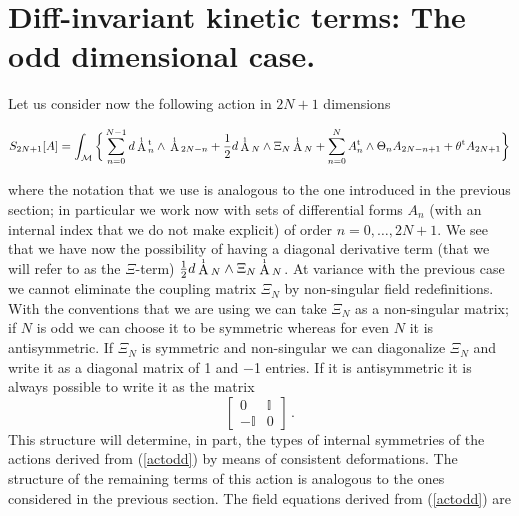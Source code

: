 \documentclass[prd,a4paper,twocolumn,amssymb,amsmath,nofootinbib,showpacs]{revtex4}
\newcommand{\au}{
\begin{picture}(11,3)(-2,-2)
\put(2,5){$\scriptscriptstyle{1}$} \put(0,-3){A}
\end{picture}}
\begin{document}
\section{\label{odd} Diff-invariant kinetic terms: The odd
dimensional case.}

Let us consider now the following action in $2N+1$ dimensions
\begin{widetext}
\begin{equation}
S_{2N+1}[A]=\int_{\mathcal{M}}\bigg\{\sum_{n=0}^{N-1}d\au_n^{\rm{t}}
\wedge\au_{2N-n}+\frac{1}{2}d\au_N\wedge\Xi_N\au_N+
\sum_{n=0}^{N}A_n^{\rm{t}}\wedge\Theta_nA_{2N-n+1}+
\theta^{\rm{t}}A_{2N+1}\bigg\}\label{actodd}
\end{equation}
\end{widetext}
where the notation that we use is analogous to the one introduced
in the previous section; in particular we work now with sets of
differential forms $A_n$ (with an internal index that we do not
make explicit) of order $n=0,\ldots,2N+1$. We see that we have now
the possibility of having a diagonal derivative term (that we will
refer to as the $\Xi$-term) $\frac{1}{2}d\au_N\wedge\Xi_N\au_N$.
At variance with the previous case we cannot eliminate the
coupling matrix $\Xi_N$ by non-singular field redefinitions. With
the conventions that we are using we can take $\Xi_N$ as a
non-singular matrix; if $N$ is odd we can choose it to be
symmetric whereas for even $N$ it is antisymmetric. If $\Xi_N$ is
symmetric and non-singular we can diagonalize $\Xi_N$  and write
it as a diagonal matrix of 1 and $-$1 entries. If it is
antisymmetric it is always possible to write it as the matrix
$$
\left[
\begin{array}{rr}
0 & \mathbb{I}\\
-\mathbb{I} & 0
\end{array}
\right]\,.
$$
This structure will determine, in part, the types of internal
symmetries of the actions derived from (\ref{actodd}) by means of
consistent deformations. The structure of the remaining terms of
this action is analogous to the ones considered in the previous
section. The field equations derived from (\ref{actodd}) are
\end{document}
